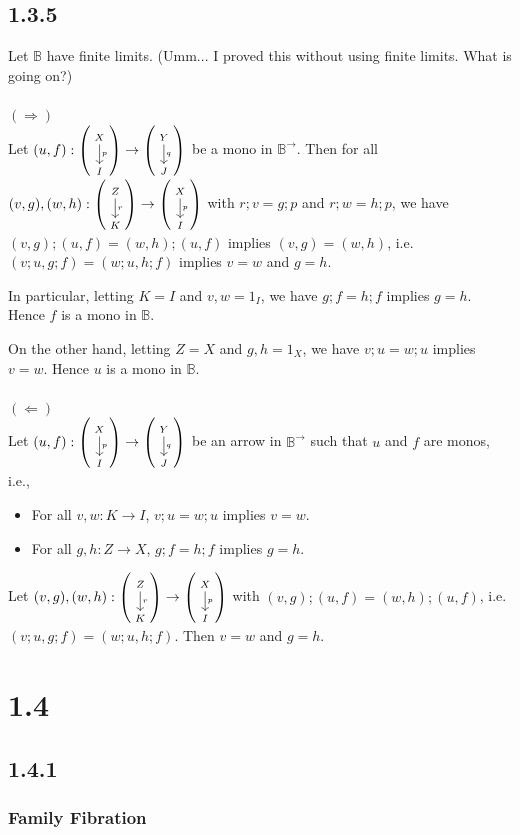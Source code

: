 \documentclass{article}
\newcommand{\ddisp}[3]{
\left(
\scriptsize
\begin{tikzcd}
#1 \ar[d, "\footnotesize{#2}"] \\
#3
\end{tikzcd}
\normalsize
\right)
}
\begin{document}
\subsection*{1.3.5}

Let $\mathbb B$ have finite limits. (Umm... I proved this without using finite limits. What is going on?)
~\\~\\
$(\Rightarrow)$~\\
Let $(u,f) : \ddisp{X}{p}{I} \to \ddisp{Y}{q}{J}$ be a mono in $\mathbb B^{\to}$. Then for all 
$(v,g),(w,h) : \ddisp{Z}{r}{K} \to \ddisp{X}{p}{I}$ with $r;v = g;p$ and $r;w = h;p$, 
we have $(v,g);(u,f) = (w,h);(u,f)$ implies 
$(v,g) = (w,h)$, i.e. $(v;u, g;f) = (w;u,h;f)$ implies $v = w$ and $g = h$.

In particular, letting $K = I$ and $v,w = 1_I$, we have $g;f = h;f$ implies $g = h$.
Hence $f$ is a mono in $\mathbb B$. 

On the other hand, letting $Z = X$ and $g,h = 1_X$, we have $v;u = w;u$ implies $v = w$.
Hence $u$ is a mono in $\mathbb B$.
~\\~\\
$(\Leftarrow)$~\\
Let $(u,f) : \ddisp{X}{p}{I} \to \ddisp{Y}{q}{J}$ be an arrow in $\mathbb B^{\to}$ %
such that $u$ and $f$ are monos, i.e.,
\begin{itemize}
\item For all $v,w : K \to I$, $v;u = w;u$ implies $v = w$.
\item For all $g,h : Z \to X$, $g;f = h;f$ implies $g = h$.
\end{itemize}
Let $(v,g),(w,h) : \ddisp{Z}{r}{K} \to \ddisp{X}{p}{I}$ %
with $(v,g);(u,f) = (w,h);(u,f)$, i.e. $(v;u,g;f) = (w;u,h;f)$. Then $v = w$ and $g = h$. 

\section*{1.4}

\subsection*{1.4.1}

\subsubsection*{Family Fibration}
\end{document}
